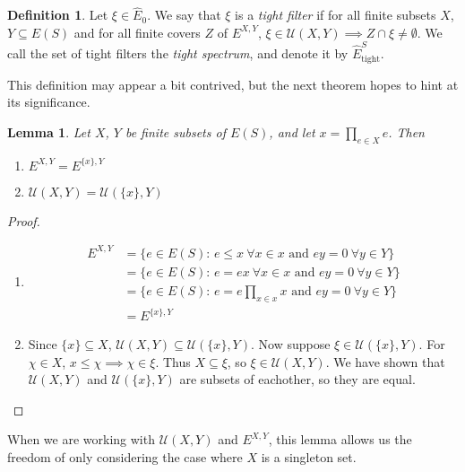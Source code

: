 \documentclass[12pt]{article}
\newtheorem{lemma}[theorem]{Lemma}
\theoremstyle{definition}
\newtheorem{definition}[theorem]{Definition}
\begin{document}
\begin{definition} 
    Let $\xi \in \hat{E}_0$. We say that $\xi$ is a \emph{tight filter} if for all finite subsets $X$, $Y \subseteq E(S)$
    and for all finite covers $Z$ of $E^{X, Y}$, $\xi \in \mathcal{U}(X, Y) \implies Z \cap \xi \neq \emptyset$. We call
    the set of tight filters the \emph{tight spectrum}, and denote it by $\hat{E}_{\text{tight}}^S$.
\end{definition}
This definition may appear a bit contrived, but the next theorem hopes to hint at its significance.

\begin{lemma} Let $X$, $Y$ be finite subsets of $E(S)$, and let $x = \prod_{e \in X} e$. Then
    \begin{enumerate}
        \item[(i)] $E^{X, Y} = E^{\{x\}, Y}$
        \item[(ii)] $\mathcal{U}(X, Y) = \mathcal{U}(\{x\}, Y)$
    \end{enumerate}
\end{lemma}
\begin{proof}
    \begin{enumerate}
        \item[(i)] 
            \begin{align*}
                E^{X, Y} &= \{ e \in E(S)\text{: } e \leq x \ \forall x \in x \text{ and } ey = 0 \ \forall y \in Y \} \\
                         &= \{ e \in E(S)\text{: } e = ex \ \forall x \in x \text{ and } ey = 0 \ \forall y \in Y \} \\
                         &= \{ e \in E(S)\text{: } e = e \prod_{x \in x} x \text{ and } ey = 0 \ \forall y \in Y \} \\
                         &= E^{\{x\}, Y}
            \end{align*}
        \item[(ii)]
            Since $\{x\} \subseteq X$, $\mathcal{U}(X, Y) \subseteq \mathcal{U}(\{x\}, Y)$. Now suppose $\xi \in \mathcal{U}(\{x\}, Y)$.
            For $\chi \in X$, $x \leq \chi \implies \chi \in \xi$. Thus $X \subseteq \xi$, so $\xi \in \mathcal{U}(X, Y)$. We have
            shown that $\mathcal{U}(X, Y)$ and $\mathcal{U}(\{x\}, Y)$ are subsets of eachother, so they are equal.
    \end{enumerate}
\end{proof}
When we are working with $\mathcal{U}(X, Y)$ and $E^{X, Y}$, this lemma allows us the freedom of only considering the case
where $X$ is a singleton set.
\end{document}

